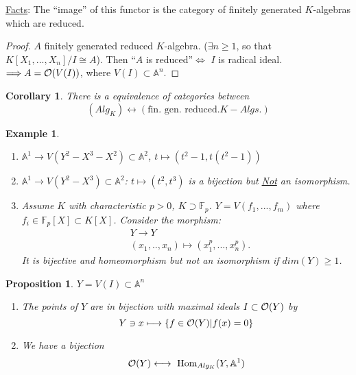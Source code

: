 \documentclass[11pt]{article}
\newtheorem{prop}[thm]{Proposition}
\newtheorem{cor}[thm]{Corollary}
\newtheorem{ex}[thm]{Example}
\renewcommand{\hom}{\text{ Hom}}
\newcommand{\affn}{\mathbb A}
\newcommand{\calo}{{\cal O}}
\newcommand{\Lrta}{\Longrightarrow}
\newcommand{\lrta}{\longrightarrow}
\newcommand{\llrta}{\longleftrightarrow}
\newcommand{\Llrta}{\Longleftrightarrow}
\begin{document}
	\underline{Facts}: The ``image'' of this functor is the category of finitely generated $K$-algebras which are reduced.
	\begin{proof}
		$A$ finitely generated reduced $K$-algebra. ($\exists n\geq 1$, so that $K[X_1,...,X_n]/I\cong A$). Then ``$A$ is reduced''$\Llrta$ $I$ is radical ideal.
		$\Lrta A=\calo(V(I))$, where $V(I)\subset \affn^n$.
	\end{proof}
	
	\begin{cor}
		There is a equivalence of categories between 
		$$
		(Alg_K)\llrta (\text{fin. gen. reduced.} K-Algs.)
		$$
	\end{cor}
	
	\begin{ex}\ 
		\begin{enumerate}[label=(\arabic*)]
			\item $\affn^1\lrta V(Y^2-X^3-X^2)\subset \affn^2$, $t\mapsto (t^2-1,t(t^2-1))$
			\item $\affn^1\lrta V(Y^2-X^3)\subset \affn^2$: $t\longmapsto (t^2,t^3)$ is a bijection but \underline{Not} an isomorphism.
			\item Assume $K$ with characteristic $p>0$, $K\supset \mathbb{F}_p$. $Y=V(f_1,...,f_m)$ where $f_i\in \mathbb{F}_p[X]\subset K[X]$. Consider the morphism:
			$$
			\begin{aligned}
			&Y\lrta Y\\
			& (x_1,..,x_n)\longmapsto (x_1^p,...,x_n^p).
			\end{aligned}
			$$
			It is bijective and homeomorphism but not an isomorphism if $dim(Y)\geq 1$.
		\end{enumerate}
	\end{ex}
	\begin{prop}
		$Y=V(I)\subset \affn^n$
		\begin{enumerate}[label=(\arabic*)]
			\item The points of $Y$ are in bijection with maximal ideals $I\subset \calo(Y)$ by 
			$$
			Y\ni x\longmapsto \{f\in \calo(Y)|f(x)=0\}
			$$
			\item We have a bijection 
			$$
			\calo(Y)\llrta \hom_{Alg_K}(Y,\affn^1)
			$$
		\end{enumerate}
	\end{prop}
\end{document}
